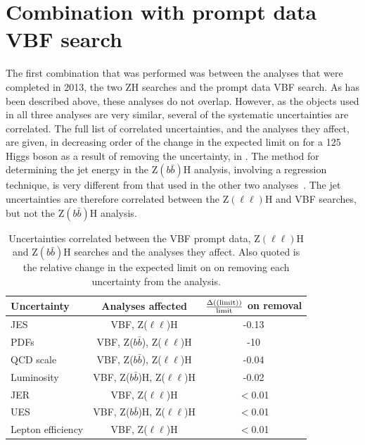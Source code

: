 \section{Combination with prompt data VBF search}
\label{sec:combprompt}
The first combination that was performed was between the analyses that were completed in 2013, the two ZH searches and the prompt data \ac{VBF} search. As has been described above, these analyses do not overlap. However, as the objects used in all three analyses are very similar, several of the systematic uncertainties are correlated. The full list of correlated uncertainties, and the analyses they affect, are given, in decreasing order of the change in the expected limit on \BRinv for a 125 \GeV Higgs boson as a result of removing the uncertainty, in . The method for determining the jet energy in the Z$(b\bar{b})$H analysis, involving a regression technique, is very different from that used in the other two analyses~\cite{CMS-PAS-HIG-13-028}. The jet uncertainties are therefore correlated between the Z$(\ell\ell)$H and \ac{VBF} searches, but not the Z$(b\bar{b})$H analysis.

\begin{table}
  \caption{Uncertainties correlated between the \ac{VBF} prompt data, Z$(\ell\ell)$H and Z$(b\bar{b})$H searches and the analyses they affect. Also quoted is the relative change in the expected limit on \BRinv on removing each uncertainty from the analysis.}
  \label{tab:promptcorrs}
  \begin{tabular}{lcc}
    \hline
    \hline
    Uncertainty & Analyses affected & $\frac{\Delta(\rm(limit))}{\rm{limit}}$ on removal \\
    \hline
    \ac{JES} & VBF, Z($\ell\ell$)H & -0.13 \\
    PDFs & VBF, Z($b\bar{b}$), Z($\ell\ell$)H & -10 \\
    QCD scale & VBF, Z($b\bar{b}$), Z($\ell\ell$)H & -0.04\\
    Luminosity & VBF, Z($b\bar{b}$)H, Z($\ell\ell$)H & -0.02\\
    \ac{JER} & VBF, Z($\ell\ell$)H & $<$0.01\\
    \ac{UES} & VBF, Z($b\bar{b}$)H, Z($\ell\ell$)H & $<$0.01\\
    Lepton efficiency & VBF, Z($\ell\ell$)H & $<$0.01\\
    \hline
    \hline
  \end{tabular}
\end{table}

